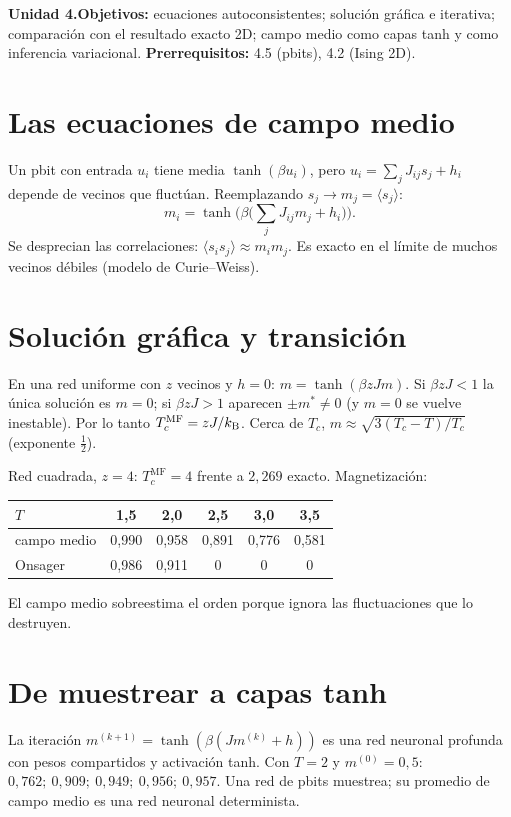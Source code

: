 \documentclass[11pt,a4paper]{article}
\begin{document}

\noindent\textbf{Unidad 4.}\quad\textbf{Objetivos:} ecuaciones autoconsistentes; solución gráfica e iterativa; comparación con el resultado exacto 2D;
campo medio como capas tanh y como inferencia variacional.
\textbf{Prerrequisitos:} 4.5 (pbits), 4.2 (Ising 2D).

\section{Las ecuaciones de campo medio}
Un pbit con entrada $u_i$ tiene media $\tanh(\beta u_i)$, pero $u_i=\sum_jJ_{ij}s_j+h_i$ depende de vecinos que fluctúan. Reemplazando $s_j\to m_j=\langle s_j\rangle$:
\begin{equation}
m_i=\tanh\Big(\beta\big(\textstyle\sum_jJ_{ij}m_j+h_i\big)\Big).
\end{equation}
Se desprecian las correlaciones: $\langle s_is_j\rangle\approx m_im_j$. Es exacto en el límite de muchos vecinos débiles (modelo de Curie--Weiss).

\section{Solución gráfica y transición}
En una red uniforme con $z$ vecinos y $h=0$: $m=\tanh(\beta zJm)$. Si $\beta zJ<1$ la única solución es $m=0$; si $\beta zJ>1$ aparecen $\pm m^*\neq0$ (y
$m=0$ se vuelve inestable). Por lo tanto $T_c^{\text{MF}}=zJ/k_{\mathrm B}$. Cerca de $T_c$, $m\approx\sqrt{3(T_c-T)/T_c}$ (exponente $\tfrac12$).
\begin{ejemplo}
Red cuadrada, $z=4$: $T_c^{\text{MF}}=4$ frente a $2{,}269$ exacto. Magnetización:
\begin{center}\begin{tabular}{lccccc}\toprule
$T$ & 1,5 & 2,0 & 2,5 & 3,0 & 3,5\\\midrule
campo medio & 0,990 & 0,958 & 0,891 & 0,776 & 0,581\\
Onsager & 0,986 & 0,911 & 0 & 0 & 0\\\bottomrule\end{tabular}\end{center}
El campo medio sobreestima el orden porque ignora las fluctuaciones que lo destruyen.
\end{ejemplo}

\section{De muestrear a capas tanh}
La iteración $m^{(k+1)}=\tanh(\beta(Jm^{(k)}+h))$ es una red neuronal profunda con pesos compartidos y activación tanh. Con $T=2$ y $m^{(0)}=0{,}5$:
$0{,}762;\ 0{,}909;\ 0{,}949;\ 0{,}956;\ 0{,}957$. Una red de pbits muestrea; su promedio de campo medio es una red neuronal determinista.
\end{document}
